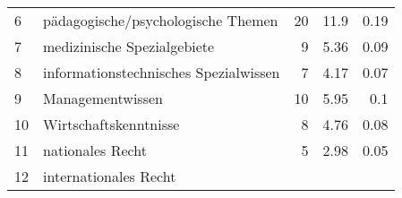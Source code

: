 \begin{longtable}{lXrrr}
     6 &
     \multicolumn{1}{X}{ pädagogische/psychologische Themen   } &


       \num{20} &
       \num[round-mode=places,round-precision=2]{11.9} &
         \num[round-mode=places,round-precision=2]{0.19} \\

     7 &
     \multicolumn{1}{X}{ medizinische Spezialgebiete   } &


       \num{9} &
       \num[round-mode=places,round-precision=2]{5.36} &
         \num[round-mode=places,round-precision=2]{0.09} \\

     8 &
     \multicolumn{1}{X}{ informationstechnisches Spezialwissen   } &


       \num{7} &
       \num[round-mode=places,round-precision=2]{4.17} &
         \num[round-mode=places,round-precision=2]{0.07} \\

     9 &
     \multicolumn{1}{X}{ Managementwissen   } &


       \num{10} &
       \num[round-mode=places,round-precision=2]{5.95} &
         \num[round-mode=places,round-precision=2]{0.1} \\

     10 &
     \multicolumn{1}{X}{ Wirtschaftskenntnisse   } &


       \num{8} &
       \num[round-mode=places,round-precision=2]{4.76} &
         \num[round-mode=places,round-precision=2]{0.08} \\

     11 &
     \multicolumn{1}{X}{ nationales Recht   } &


       \num{5} &
       \num[round-mode=places,round-precision=2]{2.98} &
         \num[round-mode=places,round-precision=2]{0.05} \\

     12 &
     \multicolumn{1}{X}{ internationales Recht   } &



\end{longtable}
